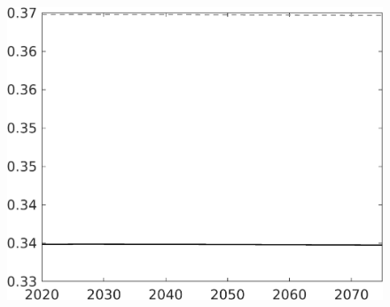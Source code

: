 \documentclass[12pt]{article}
\begin{document}
\begin{figure}[h!!]
\begin{minipage}[]{0.32\textwidth}
	\end{minipage}	
	\begin{minipage}[]{0.32\textwidth}
		\includegraphics[width=1\textwidth]{../../codding_model/own_basedOnFried/optimalPol_010922_revision/figures/all_13Sept22/CompTaul_LFBAU_Reg0_Ln_spillover0_nsk1_xgr0_knspil0_sep1_countec0_GovRev0_etaa0.79_lgd0.png}
	\end{minipage}
\end{figure}
\end{document}
